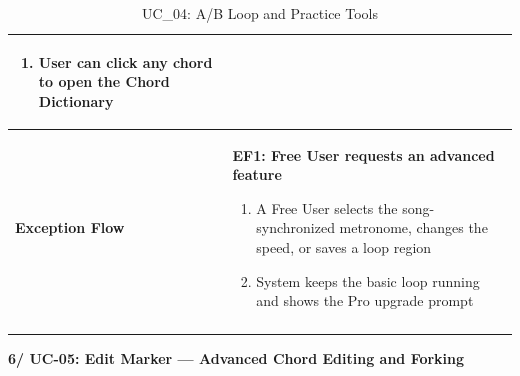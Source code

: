 \documentclass[a4paper]{article}
\newlength{\ucLeft}
\begin{document}
\begin{longtable}{|>{\bfseries}p{\ucLeft}|p{\dimexpr\linewidth-\ucLeft-2\tabcolsep-2\arrayrulewidth}|}
\begin{enumerate}[leftmargin=1.5em, nosep, topsep=2pt, partopsep=0pt, parsep=0pt, after=\strut]
    \item User can click any chord to open the Chord Dictionary
\end{enumerate}
\\ \hline
Exception Flow &
\textbf{EF1: Free User requests an advanced feature}
\begin{enumerate}[leftmargin=1.5em, nosep, topsep=2pt, partopsep=0pt, parsep=0pt, after=\strut]
    \item A Free User selects the song-synchronized metronome, changes the speed, or saves a loop region
    \item System keeps the basic loop running and shows the Pro upgrade prompt
\end{enumerate}
\\ \hline
\caption{UC\_04: A/B Loop and Practice Tools}\label{tab:uc04_loop}
\end{longtable}

\vspace{0.5em}
\noindent\textbf{6/ UC-05: Edit Marker --- Advanced Chord Editing and Forking}
\end{document}

